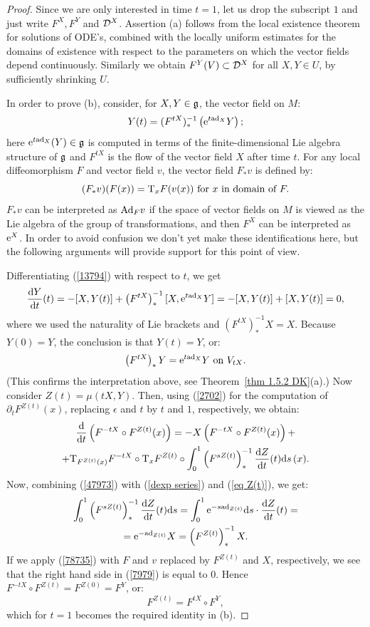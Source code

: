 \begin{proof}
    Since we are only interested in time $t=1$, let us drop the subscript $1$ and just write $F^X,F^Y$ and $\mathcal{D}^X$. Assertion (a) follows from the local existence theorem for solutions of ODE's, combined with the locally uniform estimates for the domains of existence with respect to the parameters on which the vector fields depend continuously. Similarly we obtain $F^Y(V)\subset \mathcal{D}^X$ for all $X,Y\in U$, by sufficiently shrinking $U$.

    In order to prove (b), consider, for $X,Y\in\mathfrak{g}$, the vector field on $M$:
    \[Y(t)=(F^{tX})_\ast^{-1}\left(\mathrm{e}^{t\mathrm{ad}_X}Y\right);\label{13794}\]
    here $\mathrm{e}^{t\mathrm{ad}_X}(Y)\in\mathfrak{g}$ is computed in terms of the finite-dimensional Lie algebra structure of $\mathfrak{g}$ and $F^{tX}$ is the flow of the vector field $X$ after time $t$. For any local diffeomorphism $F$ and vector field $v$, the vector field $F_\ast v$ is defined by:
    \[(F_\ast v)(F(x))=\mathrm{T}_xF(v(x))\text{ for }x\text{ in domain of }F.\label{78735}\]
    $F_\ast v$ can be interpreted as $\mathrm{Ad}_F v$ if the space of vector fields on $M$ is viewed as the Lie algebra of the group of transformations, and then $F^X$ can be interpreted as $\mathrm{e}^X$. In order to avoid confusion we don't yet make these identifications here, but the following arguments will provide support for this point of view.

    Differentiating (\ref{13794}) with respect to $t$, we get
    \[\frac{{\mathrm{d}} Y}{{\mathrm{d}} t}(t)=-[X,Y(t)]+\left(F^{tX}\right)_\ast^{-1}[X,\mathrm{e}^{t\mathrm{ad}_X}Y]=-[X,Y(t)]+[X,Y(t)]=0,\]
    where we used the naturality of Lie brackets and $(F^{tX})_\ast^{-1}X=X$. Because $Y(0)=Y$, the conclusion is that $Y(t)=Y$, or:
    \[\left(F^{tX}\right)_\ast Y=\mathrm{e}^{t\mathrm{ad}_X}Y\text{ on }V_{tX}.\label{47973}\]
    (This confirms the interpretation above, see Theorem~\ref{thm 1.5.2 DK}(a).) Now consider $Z(t)=\mu(tX,Y)$. Then, using (\ref{2702}) for the computation of $\partial_t F^{Z(t)}(x)$, replacing $\epsilon$ and $t$ by $t$ and $1$, respectively, we obtain:
    \begin{multline}
        \frac{{\mathrm{d}}}{{\mathrm{d}} t}\left(F^{-tX}\circ F^{Z(t)}(x)\right)=-X\left(F^{-tX}\circ F^{Z(t)}(x)\right)+\\
        +\mathrm{T}_{F^{Z(t)}(x)}F^{-tX}\circ \mathrm{T}_xF^{Z(t)}\circ\int_0^1 \left(F^{sZ(t)}\right)_\ast^{-1}\frac{{\mathrm{d}} Z}{{\mathrm{d}} t}(t){\mathrm{d}} s\,(x).\label{7979}
    \end{multline}
    Now, combining (\ref{47973}) with (\ref{dexp series}) and (\ref{eq Z(t)}), we get:
    \begin{multline}
        \int_0^1\left(F^{sZ(t)}\right)_\ast^{-1}\frac{{\mathrm{d}} Z}{{\mathrm{d}} t}(t){\mathrm{d}} s
        =\int_0^1 \mathrm{e}^{-s\mathrm{ad}_{Z(t)}}{\mathrm{d}} s \cdot \frac{{\mathrm{d}} Z}{{\mathrm{d}} t}(t)=\\
        =\mathrm{e}^{-\mathrm{ad}_{Z(t)}}X=\left(F^{Z(t)}\right)_\ast^{-1} X.
    \end{multline}
    If we apply (\ref{78735}) with $F$ and $v$ replaced by $F^{Z(t)}$ and $X$, respectively, we see that the right hand side in (\ref{7979}) is equal to $0$. Hence $F^{-tX}\circ F^{Z(t)}=F^{Z(0)}=F^Y$, or:
    \[F^{Z(t)}=F^{tX}\circ F^Y,\]
    which for $t=1$ becomes the required identity in (b).


\end{proof}

